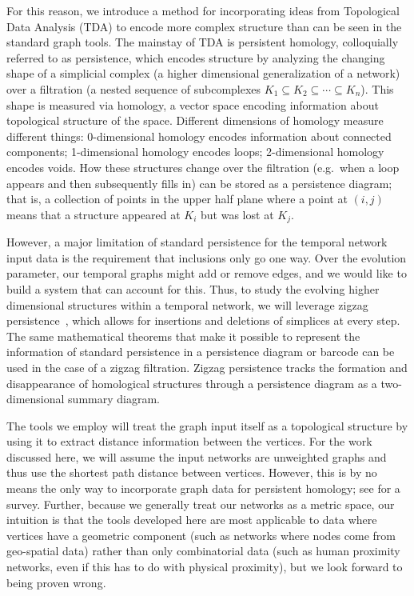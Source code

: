 For this reason, we introduce a method for incorporating ideas from Topological Data Analysis (TDA) \cite{Dey2021,Munch2017} to encode more complex structure than can be seen in the standard graph tools. 
The mainstay of TDA is persistent homology, colloquially referred to as persistence, which  encodes structure by analyzing the changing shape of a simplicial complex (a higher dimensional generalization of a network) over a filtration (a nested sequence of subcomplexes $K_1 \subseteq K_2 \subseteq \cdots \subseteq K_n$).
This shape is measured via homology, a vector space encoding information about topological structure of the space. 
Different dimensions of homology measure different things: 0-dimensional homology encodes information about connected components; 1-dimensional homology encodes loops; 2-dimensional homology encodes voids. 
How these structures change over the filtration (e.g.~when a loop appears and then subsequently fills in) can be stored as a persistence diagram; that is, a collection of points in the upper half plane where a point at $(i,j)$ means that a structure appeared at $K_i$ but was lost at $K_j$. 


However, a major limitation of standard persistence for the temporal network input data is the requirement that inclusions only go one way. 
Over the evolution parameter, our temporal graphs might add or remove edges, and we would like to build a system that can account for this. 
Thus, to study the evolving higher dimensional structures within a temporal network, we will leverage zigzag persistence~\cite{Carlsson2010}, which allows for insertions and deletions of simplices at every step.
The same mathematical theorems that make it possible to represent the information of standard persistence in a persistence diagram or barcode can be used in the case of a zigzag filtration. 
Zigzag persistence tracks the formation and disappearance of homological structures through a persistence diagram as a two-dimensional summary diagram. 

The tools we employ will treat the graph input itself as a topological structure by using it to extract distance information between the vertices. 
For the work discussed here, we will assume the input networks are unweighted graphs and thus use the shortest path distance between vertices. 
However, this is by no means the only way to incorporate graph data for persistent homology; see \cite{Aktas2019} for a survey. 
Further, because we generally treat our networks as a metric space, our intuition is that the tools developed here are most applicable to data where vertices have a geometric component (such as networks where nodes come from geo-spatial data) rather than only combinatorial data (such as human proximity networks, even if this has to do with physical proximity), but we look forward to being proven wrong.

